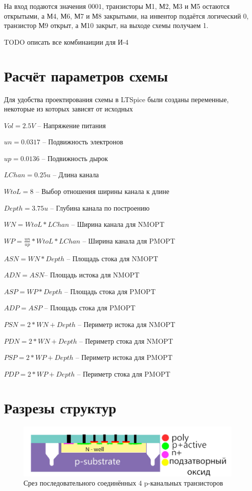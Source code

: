 \documentclass[a4paper,14pt]{article}
\begin{document}
На вход подаются значения $0001$, транзисторы М1, М2, М3 и М5 остаются открытыми, а М4, М6, М7 и М8	 закрытыми, на инвентор подаётся логический 0, транзистор М9 открыт, а М10 закрыт, на выходе схемы получаем 1.

TODO описать все комбинаиции для И-4

\section{Расчёт параметров схемы}

Для удобства проектирования схемы в LTSpice были созданы переменные, некоторые из которых зависят от исходных

$ Vol = 2.5V  $ -- Напряжение питания

$ un = 0.0317 $ -- Подвижность электронов

$ up = 0.0136 $ -- Подвижность дырок

$ LChan=0.25u $ -- Длина канала

$ WtoL=8 $ -- Выбор отношения ширины канала к длине

$ Depth=3.75u $ -- Глубина канала по построению

$ WN=WtoL * LChan $ -- Ширина канала для NMOPT

$ WP= \frac{un}{up} * WtoL* LChan $ -- Ширина канала для PMOPT

$ ASN=WN * Depth $ -- Площадь стока для NMOPT

$ ADN= ASN $-- Площадь истока для NMOPT

$ ASP=WP * Depth$ -- Площадь стока для PMOPT

$ ADP=ASP $ -- Площадь стока для PMOPT

$ PSN=2 * WN + Depth $ -- Периметр истока для NMOPT

$ PDN=2 * WN + Depth $ -- Периметр стока для NMOPT

$ PSP=2 * WP + Depth $ -- Периметр истока для PMOPT

$ PDP=2 * WP + Depth $ -- Периметр стока для PMOPT


\section{Разрезы структур}

\begin{figure}[H]
	\centering		
	\includegraphics[width=\linewidth]{image/slice_serial}
	\caption{Срез последовательного соединённых 4 p-канальных транзисторов}\label{img:slice_serial}
\end{figure}
\end{document}
